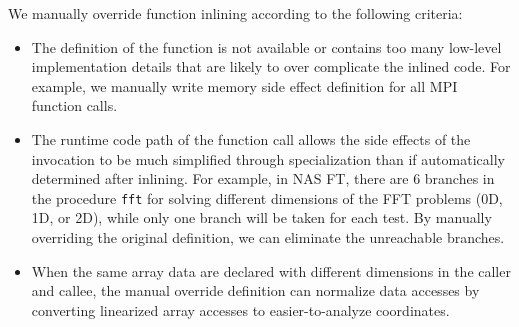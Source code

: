 We manually override function inlining according to the following criteria:
\begin{itemize}
\item The definition of the function is not available or contains too many low-level implementation details that are likely to over complicate the inlined code.
For example, we manually write memory side effect definition for all MPI function calls.
\item The runtime code path of the function call allows the side effects of the invocation to be much simplified through specialization than if automatically determined after inlining.
For example, in NAS FT, there are 6 branches in the procedure \texttt{fft}
  for solving different dimensions of the FFT problems (0D, 1D, or 2D),
  while only one branch will be taken for each test.
By manually overriding the original definition, we can eliminate the unreachable branches.
\item When the same array data are declared with different dimensions in the caller and callee,
  the manual override definition can normalize data accesses by converting linearized array accesses to easier-to-analyze coordinates.
\end{itemize}


